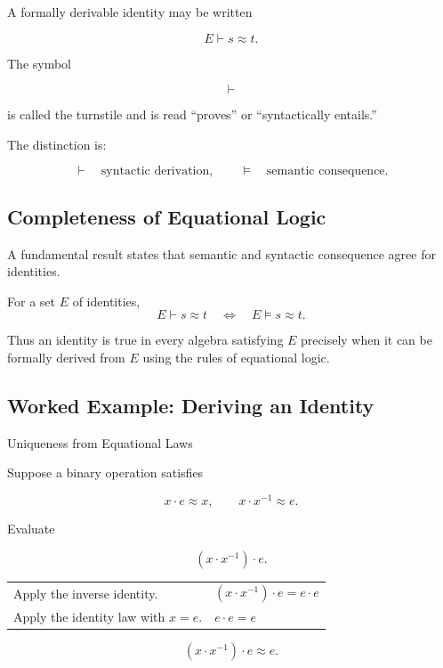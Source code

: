 A formally derivable identity may be written

\[ E\vdash s\approx t. \]

The symbol

\[ \vdash \]

is called the turnstile and is read ``proves'' or ``syntactically entails.''

The distinction is:

\[ \vdash\quad\text{syntactic derivation}, \qquad
\models\quad\text{semantic consequence}. \]

\subsection{Completeness of Equational Logic}
\label{subsec:equational-completeness}

A fundamental result states that semantic and syntactic consequence agree
for identities.

\begin{theorem}
For a set \(E\) of identities,
\[ E\vdash s\approx t
\quad\Longleftrightarrow\quad
E\models s\approx t. \]
\end{theorem}

Thus an identity is true in every algebra satisfying \(E\) precisely when it
can be formally derived from \(E\) using the rules of equational logic.

\subsection{Worked Example: Deriving an Identity}
\label{subsec:worked-equational-identity}

\begin{workedexamplebox}{Uniqueness from Equational Laws}

Suppose a binary operation satisfies

\[ x\cdot e\approx x,\qquad x\cdot x^{-1}\approx e. \]

Evaluate

\[ (x\cdot x^{-1})\cdot e. \]

\begin{tabularx}{\textwidth}{@{}>{\raggedright\arraybackslash}p{}X@{}}
Apply the inverse identity. &
\((x\cdot x^{-1})\cdot e=e\cdot e\)\\
Apply the identity law with \(x=e\). &
\(e\cdot e=e\)
\end{tabularx}

\begin{answerbox}
\[ \boxed{(x\cdot x^{-1})\cdot e\approx e.} \]
\end{answerbox}
\end{workedexamplebox}

